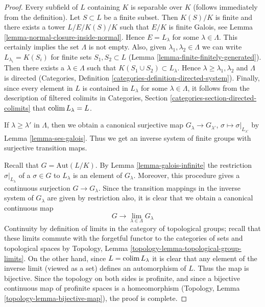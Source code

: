 \begin{proof}
Every subfield of $L$ containing $K$ is separable over $K$
(follows immediately from the definition). Let $S \subset L$
be a finite subset. Then $K(S)/K$ is finite and there exists
a tower $L/E/K(S)/K$ such that $E/K$ is finite Galois, see
Lemma \ref{lemma-normal-closure-inside-normal}.
Hence $E = L_\lambda$ for some $\lambda \in \Lambda$.
This certainly implies the set $\Lambda$ is not empty.
Also, given $\lambda_1, \lambda_2 \in \Lambda$ we can
write $L_{\lambda_i} = K(S_i)$ for finite sets
$S_1, S_2 \subset L$ (Lemma \ref{lemma-finite-finitely-generated}).
Then there exists a $\lambda \in \Lambda$ such that
$K(S_1 \cup S_2) \subset L_\lambda$. Hence
$\lambda \geq \lambda_1, \lambda_2$ and
$\Lambda$ is directed (Categories, Definition
\ref{categories-definition-directed-system}).
Finally, since every element in $L$ is contained in
$L_\lambda$ for some $\lambda \in \Lambda$, it follows
from the description of filtered colimits in
Categories, Section \ref{categories-section-directed-colimits}
that $\mathop{\mathrm{colim}}\nolimits L_\lambda = L$.

\medskip\noindent
If $\lambda \geq \lambda'$ in $\Lambda$, then we obtain a
canonical surjective map $G_\lambda \to G_{\lambda'}$,
$\sigma \mapsto \sigma|_{L_{\lambda'}}$
by Lemma \ref{lemma-ses-galois}. Thus we get an inverse
system of finite groups with surjective transition maps.

\medskip\noindent
Recall that $G = \text{Aut}(L/K)$. By Lemma \ref{lemma-galois-infinite}
the restriction $\sigma|_{L_\lambda}$ of a $\sigma \in G$ to $L_\lambda$
is an element of $G_\lambda$. Moreover, this procedure gives a continuous
surjection $G \to G_\lambda$. Since the transition mappings
in the inverse system of $G_\lambda$ are given by restriction
also, it is clear that we obtain a canonical continuous map
$$
G \longrightarrow \lim_{\lambda \in \Lambda} G_\lambda
$$
Continuity by definition of limits in the category of topological
groups; recall that these limits commute with the forgetful functor
to the categories of sets and topological spaces by
Topology, Lemma \ref{topology-lemma-topological-group-limits}.
On the other hand, since $L = \mathop{\mathrm{colim}}\nolimits L_\lambda$ it is clear
that any element of the inverse limit (viewed as a set) defines an
automorphism of $L$. Thus the map is bijective. Since the topology
on both sides is profinite, and since a bijective continuous map
of profinite spaces is a homeomorphism
(Topology, Lemma \ref{topology-lemma-bijective-map}), the proof is complete.
\end{proof}

